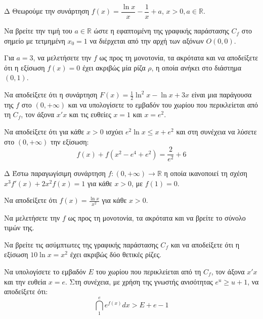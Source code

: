 \begin{thema}{Δ}
Θεωρούμε την συνάρτηση $f(x) = \dfrac{\ln x}{x} - \dfrac{1}{x} + a$, $x>0, a \in \mathbb{R}$.
\begin{erwthma}
    \item Να βρείτε την τιμή του $a \in \mathbb{R}$ ώστε η εφαπτομένη της γραφικής παράστασης $C_f$ στο σημείο με τετμημένη $x_0 = 1$ να διέρχεται από την αρχή των αξόνων $O(0,0)$.
    \item Για $a=3$, να μελετήσετε την $f$ ως προς τη μονοτονία, τα ακρότατα και να αποδείξετε ότι η εξίσωση $f(x) = 0$ έχει ακριβώς μία ρίζα $\rho$, η οποία ανήκει στο διάστημα $(0, 1)$.
    \item Να αποδείξετε ότι η συνάρτηση $\displaystyle F(x) = \frac{1}{2}\ln^2 x - \ln x + 3x$ είναι μια παράγουσα της $f$ στο $(0, +\infty)$ και να υπολογίσετε το εμβαδόν του χωρίου που περικλείεται από τη $C_f$, τον άξονα $x'x$ και τις ευθείες $x=1$ και $x=e^2$.
\item Να αποδείξετε ότι για κάθε $x > 0$ ισχύει $e^2 \ln x \le x + e^2$ και στη συνέχεια να λύσετε στο $(0, +\infty)$ την εξίσωση:
    \[ f(x) + f(x^2 - e^4 + e^2) = \frac{2}{e^2} + 6 \]
\end{erwthma}
\end{thema}

\begin{thema}{Δ}
Έστω παραγωγίσιμη συνάρτηση $f:(0, +\infty) \to \mathbb{R}$ η οποία ικανοποιεί τη σχέση $x^3 f'(x) + 2x^2 f(x) = 1$ για κάθε $x > 0$, με $f(1) = 0$.
\begin{erwthma}
    \item Να αποδείξετε ότι $\displaystyle f(x) = \frac{\ln x}{x^2}$ για κάθε $x > 0$.
    \item Να μελετήσετε την $f$ ως προς τη μονοτονία, τα ακρότατα και να βρείτε το σύνολο τιμών της.
    \item Να βρείτε τις ασύμπτωτες της γραφικής παράστασης $C_f$ και να αποδείξετε ότι η εξίσωση $10 \ln x = x^2$ έχει ακριβώς δύο θετικές ρίζες.
    \item Να υπολογίσετε το εμβαδόν $E$ του χωρίου που περικλείεται από τη $C_f$, τον άξονα $x'x$ και την ευθεία $x = e$. Στη συνέχεια, με χρήση της γνωστής ανισότητας $e^u \ge u+1$, να αποδείξετε ότι:
    \[ \dint_1^e e^{f(x)} dx > E + e - 1 \]
\end{erwthma}
\end{thema}

